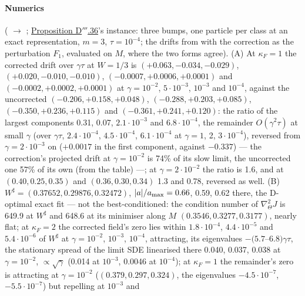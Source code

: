 \begin{sloppypar}
\paragraph{Numerics} ( $\to$ ;
\hyperref[res:thmDppp:36]{Proposition D$'''$.36}'s instance: three bumps, one particle per class at an exact
representation, $m = 3$, $\tau = 10^{-4}$; the drifts from  with the correction as the
perturbation $F_1$, evaluated on $M$, where the two forms agree). (A) At $\kappa_F = 1$ the corrected drift over
$\gamma\tau$ at $W = 1/3$ is $(+0.063, -0.034, -0.029)$, $(+0.020, -0.010, -0.010)$, $(-0.0007, +0.0006, +0.0001)$ and
$(-0.0002, +0.0002, +0.0001)$ at $\gamma = 10^{-2}$, $5\cdot10^{-3}$, $10^{-3}$ and $10^{-4}$, against the uncorrected
$(-0.206, +0.158, +0.048)$, $(-0.288, +0.203, +0.085)$, $(-0.350, +0.236, +0.115)$ and $(-0.361, +0.241, +0.120)$: the
ratio of the largest components 0.31, 0.07, $2.1\cdot10^{-3}$ and $6.8\cdot10^{-4}$, the remainder $O(\gamma^2\tau)$ at
small $\gamma$ (over $\gamma\tau$, $2.4\cdot10^{-4}$, $4.5\cdot10^{-4}$, $6.1\cdot10^{-4}$ at $\gamma = 1$, 2,
$3\cdot10^{-4}$), reversed from $\gamma = 2\cdot10^{-3}$ on ($+0.0017$ in the first component, against $-0.337$) --- the
correction's projected drift at $\gamma = 10^{-2}$ is 74\% of its slow limit, the uncorrected one 57\% of its own (from
the table) ---; at $\gamma = 2\cdot10^{-2}$ the ratio is 1.6, and at $(0.40, 0.25, 0.35)$ and $(0.36, 0.30, 0.34)$ 1.3
and 0.78, reversed as well. (B) $W^\sharp = (0.37652, 0.29876, 0.32472)$, $\lvert a\rvert/a_{\max} = 0.66$, 0.59, 0.62 there,
the D-optimal exact fit --- not the best-conditioned: the condition number of $\nabla^2_\Theta J$ is 649.9 at
$W^\sharp$ and 648.6 at its minimiser along $M$ $(0.3546, 0.3277, 0.3177)$, nearly flat; at $\kappa_F = 2$ the
corrected field's zero lies within $1.8\cdot10^{-4}$, $4.4\cdot10^{-5}$ and $5.4\cdot10^{-6}$ of $W^\sharp$ at
$\gamma = 10^{-2}$, $10^{-3}$, $10^{-4}$, attracting, its eigenvalues $-(5.7$--$6.8)\gamma\tau$, the stationary spread
of the limit SDE linearised there 0.040, 0.037, 0.038 at $\gamma = 10^{-2}$, $\propto\sqrt\gamma$ (0.014 at $10^{-3}$,
0.0046 at $10^{-4}$); at $\kappa_F = 1$ the remainder's zero is attracting at $\gamma = 10^{-2}$
($(0.379, 0.297, 0.324)$, the eigenvalues $-4.5\cdot10^{-7}$, $-5.5\cdot10^{-7}$) but repelling at $10^{-3}$ and

\end{sloppypar}
